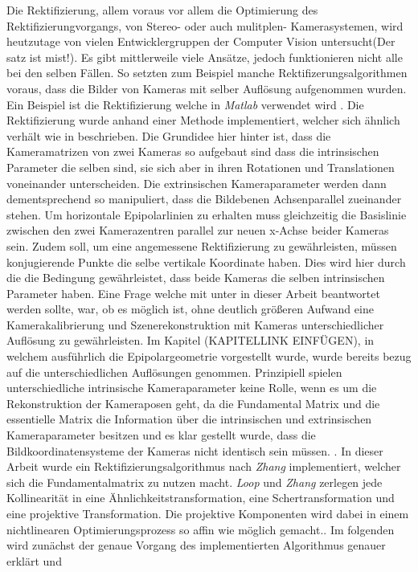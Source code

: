 Die Rektifizierung, allem voraus vor allem die Optimierung des Rektifizierungvorgangs, von Stereo- oder auch mulitplen- Kamerasystemen, wird heutzutage von vielen Entwicklergruppen der Computer Vision untersucht(Der satz ist mist!). Es gibt mittlerweile viele Ansätze, jedoch funktionieren nicht alle bei den selben Fällen. So setzten zum Beispiel manche Rektifizerungsalgorithmen voraus, dass die Bilder von Kameras mit selber Auflösung aufgenommen wurden. Ein Beispiel ist die Rektifizierung welche in \textit{Matlab} verwendet wird \cite{MatlabRec}. Die Rektifizierung wurde anhand einer Methode implementiert, welcher sich ähnlich verhält wie in \cite{FusielloSite} beschrieben. Die Grundidee hier hinter ist, dass die Kameramatrizen von zwei Kameras so aufgebaut sind dass die intrinsischen Parameter die selben sind, sie sich aber in ihren Rotationen und Translationen voneinander unterscheiden. Die extrinsischen Kameraparameter werden dann dementsprechend so manipuliert, dass die Bildebenen Achsenparallel zueinander stehen\cite{FusielloSite,Fusiello}. Um horizontale Epipolarlinien zu erhalten muss gleichzeitig die Basislinie zwischen den zwei Kamerazentren parallel zur neuen x-Achse beider Kameras sein. Zudem soll, um eine angemessene Rektifizierung zu gewährleisten, müssen konjugierende Punkte die selbe vertikale Koordinate haben. Dies wird hier durch die die Bedingung gewährleistet, dass beide Kameras die selben intrinsischen Parameter haben\cite{FusielloSite}. Eine Frage welche mit unter in dieser Arbeit beantwortet werden sollte, war, ob es möglich ist, ohne deutlich größeren Aufwand eine Kamerakalibrierung und Szenerekonstruktion mit Kameras unterschiedlicher Auflösung zu gewährleisten. Im Kapitel (KAPITELLINK EINFÜGEN), in welchem ausführlich die Epipolargeometrie vorgestellt wurde, wurde bereits bezug auf die unterschiedlichen Auflösungen genommen. Prinzipiell spielen unterschiedliche intrinsische Kameraparameter keine Rolle, wenn es um die Rekonstruktion der Kameraposen geht, da die Fundamental Matrix und die essentielle Matrix die Information über die intrinsischen und extrinsischen Kameraparameter besitzen und es klar gestellt wurde, dass die Bildkoordinatensysteme der Kameras nicht identisch sein müssen. \cite{Elements}. In dieser Arbeit wurde ein Rektifizierungsalgorithmus nach \textit{Zhang}\cite{ZZ} implementiert, welcher sich die Fundamentalmatrix zu nutzen macht. \textit{Loop} und \textit{Zhang} zerlegen jede Kollinearität in eine Ähnlichkeitstransformation, eine Schertransformation und eine projektive Transformation. Die projektive Komponenten wird dabei in einem nichtlinearen Optimierungsprozess so affin wie möglich gemacht.\cite{Fusiello,ZZ}. Im folgenden wird zunächst der genaue Vorgang des implementierten Algorithmus genauer erklärt und 
